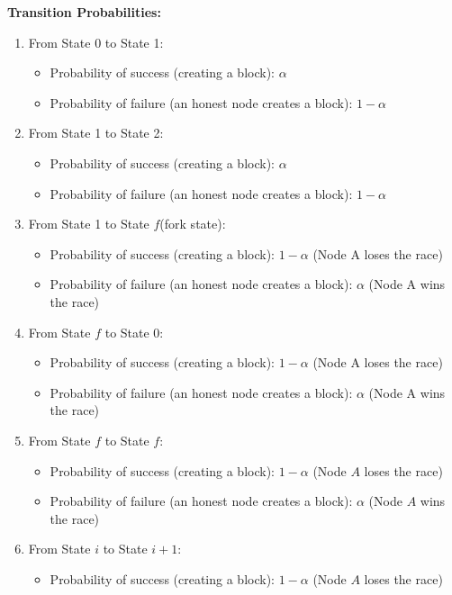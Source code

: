\noindent\textbf{Transition Probabilities:}\\
\begin{enumerate}
    \item From State 0 to State 1:
    \begin{itemize}
        \item Probability of success (creating a block): $\alpha$
        \item Probability of failure (an honest node creates a block): $1 - \alpha$
    \end{itemize}
    \item From State 1 to State 2:
    \begin{itemize}
        \item Probability of success (creating a block): $\alpha$
        \item Probability of failure (an honest node creates a block): $1 - \alpha$
    \end{itemize}
    \item From State 1 to State $f$(fork state):
    \begin{itemize}
        \item Probability of success (creating a block): $1 - \alpha$ (Node A loses the race)
        \item Probability of failure (an honest node creates a block): $\alpha$ (Node A wins the race)
    \end{itemize}
    \item From State $f$ to State 0:
    \begin{itemize}
        \item Probability of success (creating a block): $1 - \alpha$ (Node A loses the race)
        \item Probability of failure (an honest node creates a block): $\alpha$ (Node A wins the race)
    \end{itemize}
    \item From State $f$ to State $f$:
    \begin{itemize}
        \item Probability of success (creating a block): $1 - \alpha$ (Node $A$ loses the race)
        \item Probability of failure (an honest node creates a block): $\alpha$ (Node $A$ wins the race)
    \end{itemize}
    \item From State $i$ to State $i+1$:
    \begin{itemize}
        \item Probability of success (creating a block): $1 - \alpha$ (Node $A$ loses the race)

\end{itemize}
\end{enumerate}
